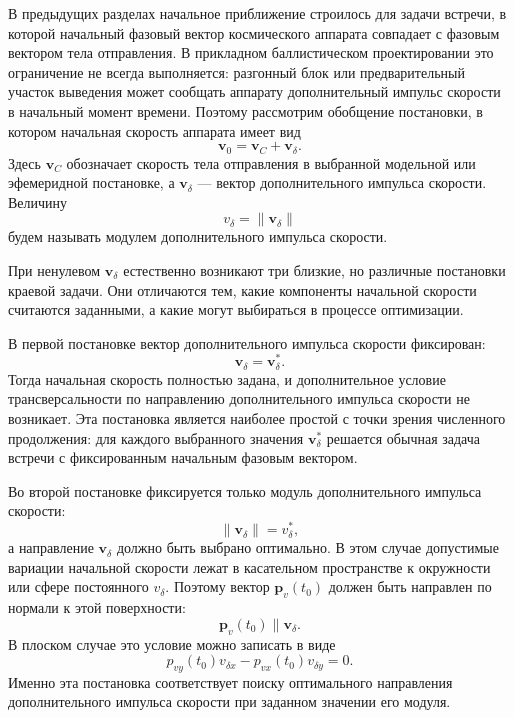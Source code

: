 В предыдущих разделах начальное приближение строилось для задачи встречи, в которой начальный фазовый вектор космического аппарата совпадает с фазовым вектором тела отправления. В прикладном баллистическом проектировании это ограничение не всегда выполняется: разгонный блок или предварительный участок выведения может сообщать аппарату дополнительный импульс скорости в начальный момент времени. Поэтому рассмотрим обобщение постановки, в котором начальная скорость аппарата имеет вид
\begin{equation}
	\mathbf v_0=\mathbf v_C+\mathbf v_\delta .
\end{equation}
Здесь \(\mathbf v_C\) обозначает скорость тела отправления в выбранной модельной или эфемеридной постановке, а \(\mathbf v_\delta\) --- вектор дополнительного импульса скорости. Величину
\begin{equation}
	v_\delta=\|\mathbf v_\delta\|
\end{equation}
будем называть модулем дополнительного импульса скорости.

При ненулевом \(\mathbf v_\delta\) естественно возникают три близкие, но различные постановки краевой задачи. Они отличаются тем, какие компоненты начальной скорости считаются заданными, а какие могут выбираться в процессе оптимизации.

В первой постановке вектор дополнительного импульса скорости фиксирован:
\begin{equation}
	\mathbf v_\delta=\mathbf v_\delta^*.
\end{equation}
Тогда начальная скорость полностью задана, и дополнительное условие трансверсальности по направлению дополнительного импульса скорости не возникает. Эта постановка является наиболее простой с точки зрения численного продолжения: для каждого выбранного значения \(\mathbf v_\delta^*\) решается обычная задача встречи с фиксированным начальным фазовым вектором.

Во второй постановке фиксируется только модуль дополнительного импульса скорости:
\begin{equation}
	\|\mathbf v_\delta\|=v_\delta^*,
\end{equation}
а направление \(\mathbf v_\delta\) должно быть выбрано оптимально. В этом случае допустимые вариации начальной скорости лежат в касательном пространстве к окружности или сфере постоянного \(v_\delta\). Поэтому вектор \(\mathbf p_v(t_0)\) должен быть направлен по нормали к этой поверхности:
\begin{equation}
	\mathbf p_v(t_0)\parallel \mathbf v_\delta .
\end{equation}
В плоском случае это условие можно записать в виде
\begin{equation}
	p_{vy}(t_0)v_{\delta x}
	-
	p_{vx}(t_0)v_{\delta y}
	=0 .
\end{equation}
Именно эта постановка соответствует поиску оптимального направления дополнительного импульса скорости при заданном значении его модуля.


